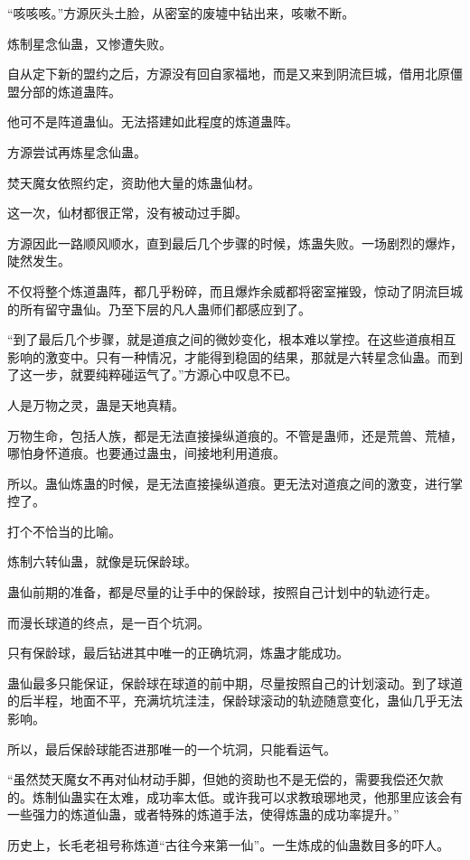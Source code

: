 \begin{this_body}
“咳咳咳。”方源灰头土脸，从密室的废墟中钻出来，咳嗽不断。

炼制星念仙蛊，又惨遭失败。

自从定下新的盟约之后，方源没有回自家福地，而是又来到阴流巨城，借用北原僵盟分部的炼道蛊阵。

他可不是阵道蛊仙。无法搭建如此程度的炼道蛊阵。

方源尝试再炼星念仙蛊。

焚天魔女依照约定，资助他大量的炼蛊仙材。

这一次，仙材都很正常，没有被动过手脚。

方源因此一路顺风顺水，直到最后几个步骤的时候，炼蛊失败。一场剧烈的爆炸，陡然发生。

不仅将整个炼道蛊阵，都几乎粉碎，而且爆炸余威都将密室摧毁，惊动了阴流巨城的所有留守蛊仙。乃至下层的凡人蛊师们都感应到了。

“到了最后几个步骤，就是道痕之间的微妙变化，根本难以掌控。在这些道痕相互影响的激变中。只有一种情况，才能得到稳固的结果，那就是六转星念仙蛊。而到了这一步，就要纯粹碰运气了。”方源心中叹息不已。

人是万物之灵，蛊是天地真精。

万物生命，包括人族，都是无法直接操纵道痕的。不管是蛊师，还是荒兽、荒植，哪怕身怀道痕。也要通过蛊虫，间接地利用道痕。

所以。蛊仙炼蛊的时候，是无法直接操纵道痕。更无法对道痕之间的激变，进行掌控了。

打个不恰当的比喻。

炼制六转仙蛊，就像是玩保龄球。

蛊仙前期的准备，都是尽量的让手中的保龄球，按照自己计划中的轨迹行走。

而漫长球道的终点，是一百个坑洞。

只有保龄球，最后钻进其中唯一的正确坑洞，炼蛊才能成功。

蛊仙最多只能保证，保龄球在球道的前中期，尽量按照自己的计划滚动。到了球道的后半程，地面不平，充满坑坑洼洼，保龄球滚动的轨迹随意变化，蛊仙几乎无法影响。

所以，最后保龄球能否进那唯一的一个坑洞，只能看运气。

“虽然焚天魔女不再对仙材动手脚，但她的资助也不是无偿的，需要我偿还欠款的。炼制仙蛊实在太难，成功率太低。或许我可以求教琅琊地灵，他那里应该会有一些强力的炼道仙蛊，或者特殊的炼道手法，使得炼蛊的成功率提升。”

历史上，长毛老祖号称炼道“古往今来第一仙”。一生炼成的仙蛊数目多的吓人。


\end{this_body}
